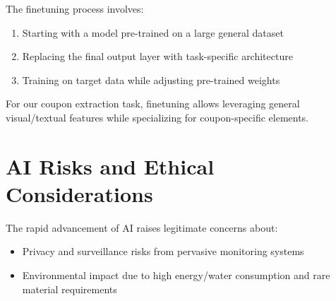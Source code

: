 \documentclass[licencjacka,en]{pracamgr}
\begin{document}
The finetuning process involves:
\begin{enumerate}
    \item Starting with a model pre-trained on a large general dataset
    \item Replacing the final output layer with task-specific architecture
    \item Training on target data while adjusting pre-trained weights \cite{finetune_cool_image}
\end{enumerate}

For our coupon extraction task, finetuning allows leveraging general visual/textual features while specializing for coupon-specific elements.





\section{AI Risks and Ethical Considerations}

The rapid advancement of AI raises legitimate concerns about:
\begin{itemize}
    \item Privacy and surveillance risks from pervasive monitoring systems \cite{not_sroka_vid, ai_scare2, ai_scare3}
    \item Environmental impact due to high energy/water consumption and rare material requirements \cite{ai_env_concerns}
\end{itemize}
\end{document}
